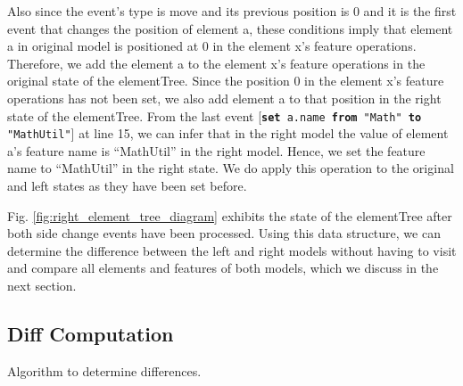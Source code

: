 \documentclass{jot}
\begin{document}
Also since the event's type is \textsf{move} and its previous position is 0 and it is the first event that changes the position of element \textsf{a}, these conditions imply that element \textsf{a} in original model is positioned at 0 in the element \textsf{x}'s feature \textsf{operations}. Therefore, we add the element \textsf{a} to  the element \textsf{x}'s feature \textsf{operations} in the original state of the \textsf{elementTree}. Since the position 0 in the element \textsf{x}'s feature \textsf{operations} has not been set, we also add element \textsf{a} to that position in the right state of the \textsf{elementTree}. From the last event [\texttt{\small \textbf{set} a.name \textbf{from} "Math" \textbf{to} "MathUtil"}] at line 15, we can infer that in the right model the value of element \textsf{a}'s feature \textsf{name} is ``MathUtil'' in the right model. Hence, we set the feature \textsf{name} to ``MathUtil'' in the right state. We do apply this operation to the original and left states as they have been set before.  

Fig. \ref{fig:right_element_tree_diagram} exhibits the state of the \textsf{elementTree} after both side change events have been processed. Using this data structure, we can determine the difference between the left and right models without having to visit and compare all elements and features of both models, which we discuss in the next section.

\subsection{Diff Computation}
\label{sec:diff_computation}

\IncMargin{1.5em}
\begin{algorithm}[H]
    \begin{footnotesize}
    \end{footnotesize}
    \caption{Algorithm to determine differences.}
    \label{alg:diff_calculation}
\end{algorithm}
\DecMargin{1.5em}
\end{document}
